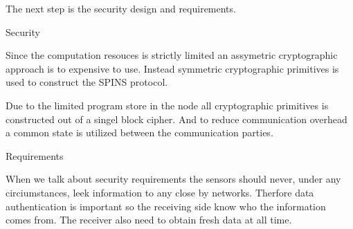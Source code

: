 \tiny
The next step is the security design and requirements.

\alert{Security}

 Since the computation resouces is strictly limited an assymetric cryptographic approach is to expensive to use. Instead symmetric cryptographic primitives is used to construct the  SPINS protocol.

\bigskip


Due to the limited program store in the node all cryptographic primitives is constructed out of a singel block cipher. And to reduce communication overhead a common state is utilized between the communication parties.

\alert{Requirements}

When we talk about security requirements the sensors should never, under any circiumstances, leek information to any close by networks. Therfore data authentication is important so the receiving side know who the information comes from. The receiver also need to obtain fresh data at all time.